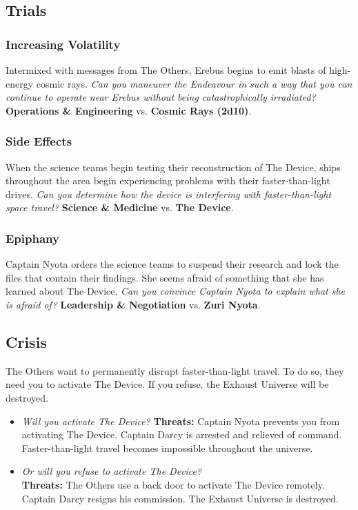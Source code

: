 \documentclass[11pt, a5paper, parskip=half-, DIV=12]{scrartcl}
\begin{document}
\newpage

\subsection*{Trials}

\subsubsection*{Increasing Volatility}
Intermixed with messages from The Others, Erebus begins to emit blasts of high-energy cosmic rays. \textit{Can you maneuver the Endeavour in such a way that you can continue to operate near Erebus without being catastrophically irradiated?} \textbf{Operations \& Engineering} vs. \textbf{Cosmic Rays (2d10)}.

\subsubsection*{Side Effects}
When the science teams begin testing their reconstruction of The Device, ships throughout the area begin experiencing problems with their faster-than-light drives. \textit{Can you determine how the device is interfering with faster-than-light space travel?} \textbf{Science \& Medicine} vs. \textbf{The Device}.

\subsubsection*{Epiphany}
Captain Nyota orders the science teams to suspend their research and lock the files that contain their findings. She seems afraid of something that she has learned about The Device. \textit{Can you convince Captain Nyota to explain what she is afraid of?} \textbf{Leadership \& Negotiation} vs. \textbf{Zuri Nyota}.

\subsection*{Crisis}
The Others want to permanently disrupt faster-than-light travel. To do so, they need you to activate The Device. If you refuse, the Exhaust Universe will be destroyed.

\begin{itemize}
	\item \textit{Will you activate The Device?} \textbf{Threats:} Captain Nyota prevents you from activating The Device. Captain Darcy is arrested and relieved of command. Faster-than-light travel becomes impossible throughout the universe. 
	\item \textit{Or will you refuse to activate The Device?} \\ \textbf{Threats:} The Others use a back door to activate The Device remotely. Captain Darcy resigns his commission. The Exhaust Universe is destroyed.
\end{itemize}
\end{document}
